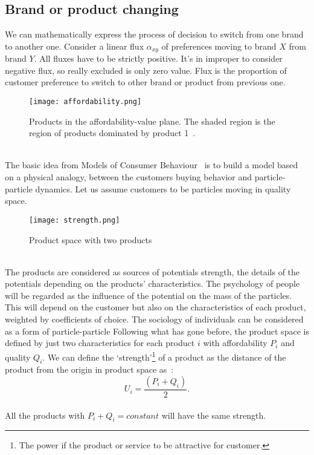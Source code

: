 \subsection{Brand or product changing} \label{subsec:brand}
We can mathematically express the process of decision to switch from one brand to another one.
Consider a linear flux $\alpha_{xy}$ of preferences moving to brand $X$ from brand $Y$.
All fluxes have to be strictly positive.
It's in improper to consider negative flux, so really excluded is only zero value.
Flux is the proportion of customer preference to switch to other brand or product from previous one.
\begin{figure}[h!]
	\begin{center}
		\texttt{[image: affordability.png]}
	\end{center}
	\caption{Products in the affordability-value plane.
	The shaded region is the region of products dominated by product 1~\cite{pantland}.}
	\label{Affordability of products}
\end{figure}
\\
The basic idea from Models of Consumer Behaviour~\cite{patel} is to build a model based on a physical analogy,
between the customers buying behavior and particle-particle dynamics.
Let us assume customers to be particles moving in quality space.\\
\begin{figure}[h!]
	\begin{center}
		\texttt{[image: strength.png]}
	\end{center}
	\caption{Product space with two products~\cite{patel}}
	\label{Strength of products}
\end{figure}
\\
The products are considered as sources of  potentials strength, the details of the potentials depending on the products’ characteristics.
The psychology of people will be regarded as the influence of the potential on the mass of the particles.
This will depend on the customer but also on the characteristics of each product, weighted by coefficients of choice.
The sociology of individuals can be considered as a form of particle-particle
Following what has gone before, the product space is defined by just two characteristics for each product $i$ with affordability $P_i$ and quality $Q_i$.
We can define the ‘strength’\footnote{The power if the product or service to be attractive for customer.} of a product as
the distance of the product from the origin in product space as~\cite{pantland}:
\\
\begin{equation} \label{eq:12}
U_i = \frac{(P_i + Q_i)}{2}.
\end{equation}
\\
All the products with $P_i + Q_i = constant$ will have the same strength.
